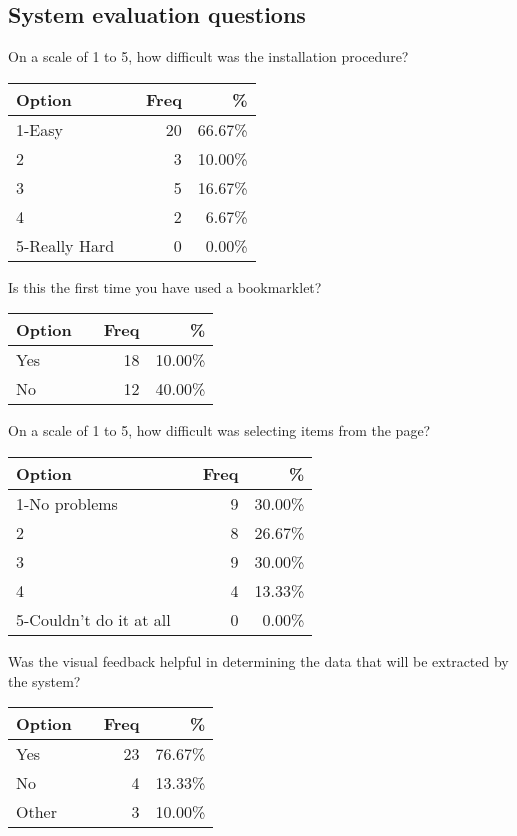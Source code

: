 \subsection{System evaluation questions}
\begin{center}
On a scale of 1 to 5, how difficult was the installation procedure?\\
\begin{tabular}{|l|c|r|r|}
\hline
Option	& & Freq & \% \\
\hline
\hline
1-Easy	&	&20	&66.67\%\\
2	&	&3	&10.00\%\\
3	&	&5	&16.67\%\\
4	&	&2	&6.67\%\\
5-Really Hard	&	&0	&0.00\%\\
\hline
\end{tabular}

Is this the first time you have used a bookmarklet?\\
\begin{tabular}{|l|c|r|r|}
\hline
Option	& & Freq & \% \\
\hline
\hline
Yes	&	&18	&10.00\%\\
No	&	&12	&40.00\%\\
\hline
\end{tabular}


On a scale of 1 to 5, how difficult was selecting items from the page?\\
\begin{tabular}{|l|c|r|r|}
\hline
Option	& & Freq & \% \\
\hline
\hline
1-No problems	&	&9	&30.00\%\\
2	&	&8	&26.67\%\\
3	&	&9	&30.00\%\\
4	&	&4	&13.33\%\\
5-Couldn't do it at all	&	&0	&0.00\%\\
\hline
\end{tabular}


Was the visual feedback helpful in determining the data that will be extracted by the system?\\
\begin{tabular}{|l|c|r|r|}
\hline
Option	& & Freq & \% \\
\hline
\hline
Yes	&	&23	&76.67\%\\
No	&	&4	&13.33\%\\
Other	&	&3	&10.00\%\\
\hline
\end{tabular}



\end{center}
